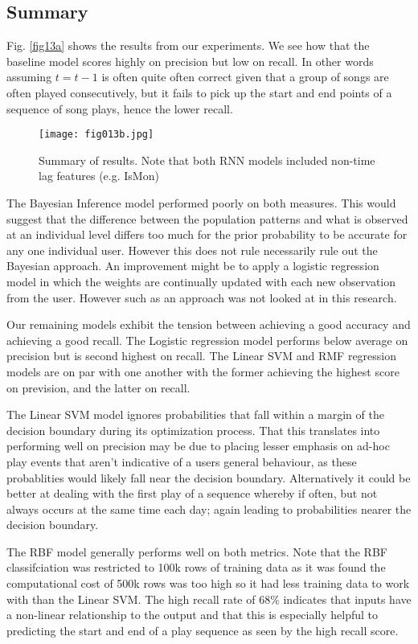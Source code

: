 \subsection{Summary}

Fig. \ref{fig13a} shows the results from our experiments. We see how that the baseline model scores highly on precision but low on recall. In other words assuming $t = t-1$ is often quite often correct given that a group of songs are often played consecutively, but it fails to pick up the start and end points of a sequence of song plays, hence the lower recall.

\begin{figure}[h!]
	\centering
	\texttt{[image: fig013b.jpg]}
	\caption{Summary of results. Note that both RNN models included non-time lag features (e.g. IsMon)}
	\label{fig13b}
\end{figure}  

The Bayesian Inference model performed poorly on both measures. This would suggest that the difference between the population patterns and what is observed at an individual level differs too much for the prior probability to be accurate for any one individual user. However this does not rule necessarily rule out the Bayesian approach. An improvement might be to apply a logistic regression model in which the weights are continually updated with each new observation from the user. However such as an approach was not looked at in this research.

Our remaining models exhibit the tension between achieving a good accuracy and achieving a good recall. The Logistic regression model performs below average on precision but is second highest on recall. The Linear SVM and RMF regression models are on par with one another with the former achieving the highest score on prevision, and the latter on recall. 

The Linear SVM model ignores probabilities that fall within a margin of the decision boundary during its optimization process. That this translates into performing well on precision may be due to placing lesser emphasis on ad-hoc play events that aren't indicative of a users general behaviour, as these probablities would likely fall near the decision boundary. Alternatively it could be better at dealing with the first play of a sequence whereby if often, but not always occurs at the same time each day; again leading to probabilities nearer the decision boundary.

The RBF model generally performs well on both metrics. Note that the RBF classifciation was restricted to 100k rows of training data as it was found the computational cost of 500k rows was too high so it had less training data to work with than the Linear SVM. The high recall rate of 68\% indicates that inputs have a non-linear relationship to the output and that this is especially helpful to predicting the start and end of a play sequence as seen by the high recall score. 
 
